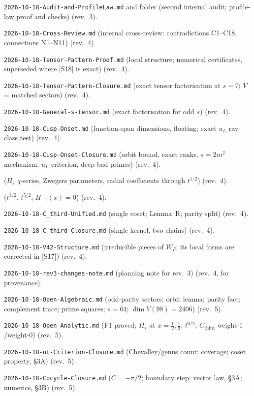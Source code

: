 \documentclass[11pt]{article}
\theoremstyle{definition}
\theoremstyle{plain}
\newcommand{\Cthird}{C_{\mathrm{third}}}
\begin{document}
\begin{enumerate}[label={[S\arabic*]},leftmargin=3em]
\item \texttt{2026-10-18-Audit-and-ProfileLaw.md} and folder  (second internal audit; profile-law proof and checks) (rev.~3).
\item \texttt{2026-10-18-Cross-Review.md} (internal cross-review: contradictions C1--C18, connections N1--N11) (rev.~4).
\item \texttt{2026-10-18-Tensor-Pattern-Proof.md} (local structure; numerical certificates, superseded where [S18] is exact) (rev.~4).
\item \texttt{2026-10-18-Tensor-Pattern-Closure.md} (exact tensor factorisation at $s=7$; $V$ = matched sectors) (rev.~4).
\item \texttt{2026-10-18-General-s-Tensor.md} (exact factorisation for odd $s$) (rev.~4).
\item \texttt{2026-10-18-Cusp-Onset.md} (function-span dimensions, floating; exact $u_L$ ray-class test) (rev.~4).
\item \texttt{2026-10-18-Cusp-Onset-Closure.md} (orbit bound, exact ranks, $s=2m^2$ mechanism, $u_L$ criterion, deep bad primes) (rev.~4).
\item {} ($H_s$ $q$-series, Zwegers parameters, radial coefficients through $t^{1/2}$) (rev.~4).
\item {} ($t^{3/2}$, $t^{5/2}$; $H_{-1}(x)=0$) (rev.~4).
\item \texttt{2026-10-18-C\_third-Unified.md} (single coset; Lemma~R; parity split) (rev.~4).
\item \texttt{2026-10-18-C\_third-Closure.md} (single kernel, two chains) (rev.~4).
\item \texttt{2026-10-18-V42-Structure.md} (irreducible pieces of $W_P$; its local forms are corrected in [S17]) (rev.~4).
\item \texttt{2026-10-18-rev3-changes-note.md} (planning note for rev.~3) (rev.~4, for provenance).
\item \texttt{2026-10-18-Open-Algebraic.md} (odd-parity sectors; orbit lemma; parity fact; complement trace; prime squares; $s=64$; $\dim V(98)=2406$) (rev.~5).
\item \texttt{2026-10-18-Open-Analytic.md} (F1 proved; $H_s$ at $x=\tfrac12,\tfrac13$, $t^{9/2}$; $\Cthird$ weight-$1$/weight-$0$) (rev.~5).
\item \texttt{2026-10-18-uL-Criterion-Closure.md} (Chevalley/genus count; coverage; coset property, \S3A) (rev.~5).
\item \texttt{2026-10-18-Cocycle-Closure.md} ($C=-\pi/2$; boundary step; vector law, \S3A; numerics, \S3B) (rev.~5).

\end{enumerate}
\end{document}
